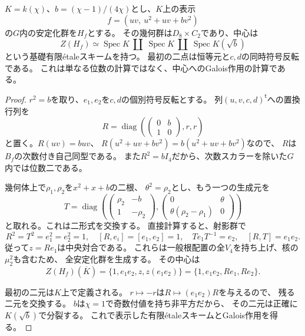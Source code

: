 \begin{lemma}[一般慣性の中心とその二次分裂体]
\label{lem:qa-noncubic-generic-inertia-center}
$K=k(\chi)$、$b=(\chi-1)/(4\chi)$とし、$K$上の表示
\[
 f=(uv,\ u^2+uv+bv^2)
\]
の$G$内の安定化群を$H_f$とする。
その幾何群は$D_8\times C_2$であり、中心は
\begin{equation}
 Z(H_f)\simeq
 \operatorname{Spec}K\ \amalg\ \operatorname{Spec}K\
 \amalg\ \operatorname{Spec}K(\sqrt b)
 \label{eq:qa-noncubic-center-splitting}
\end{equation}
という基礎有限\'{e}taleスキームを持つ。
最初の二点は恒等元と$c,d$の同時符号反転である。
これは単なる位数の計算ではなく、中心へのGalois作用の計算である。
\end{lemma}
\begin{proof}
$r^2=b$を取り、$e_1,e_2$を$c,d$の個別符号反転とする。
列$(u,v,c,d)^{\mathsf t}$への置換行列を
\[
 R=\operatorname{diag}\left(
 \begin{pmatrix}0&b\\1&0\end{pmatrix},r,r\right)
\]
と置く。$R(uv)=buv$、
$R(u^2+uv+bv^2)=b(u^2+uv+bv^2)$なので、
$R$は$B_f$の次数付き自己同型である。
また$R^2=bI_4$だから、次数スカラーを除いた$G$内では位数二である。

幾何体上で$\rho_1,\rho_2$を$x^2+x+b$の二根、
$\theta^2=\rho_2$とし、もう一つの生成元を
\[
 T=\operatorname{diag}\left(
 \begin{pmatrix}\rho_2&-b\\1&-\rho_2\end{pmatrix},
 \begin{pmatrix}0&\theta\\
 \theta(\rho_2-\rho_1)&0\end{pmatrix}\right)
\]
と取れる。これは二形式を交換する。
直接計算すると、射影群で
\[
 R^2=T^2=e_1^2=e_2^2=1,\quad
 [R,e_i]=[e_1,e_2]=1,\quad
 Te_1T^{-1}=e_2,\quad [R,T]=e_1e_2.
\]
従って$z=Re_1$は中央対合である。
これらは一般根配置の全$V_4$を持ち上げ、核の$\mu_2^2$も含むため、
全安定化群を生成する。
その中心は
\[
 Z(H_f)(\overline K)=\{1,e_1e_2,z,z(e_1e_2)\}
 =\{1,e_1e_2,Re_1,Re_2\}.
\]

最初の二元は$K$上で定義される。
$r\mapsto-r$は$R\mapsto(e_1e_2)R$を与えるので、
残る二元を交換する。
$b$は$\chi=1$で奇数付値を持ち非平方だから、
その二元は正確に$K(\sqrt b)$で分裂する。
これで表示した有限\'{e}taleスキームとGalois作用を得る。
\end{proof}

